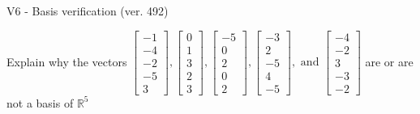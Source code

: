 \begin{exercise}
  \begin{exerciseTitle}V6 - Basis verification (ver. 492)\end{exerciseTitle}
  \begin{exerciseStatement}
    Explain why the vectors \(\left[\begin{array}{r}
-1 \\
-4 \\
-2 \\
-5 \\
3
\end{array}\right] , \left[\begin{array}{r}
0 \\
1 \\
3 \\
2 \\
3
\end{array}\right] , \left[\begin{array}{r}
-5 \\
0 \\
2 \\
0 \\
2
\end{array}\right] , \left[\begin{array}{r}
-3 \\
2 \\
-5 \\
4 \\
-5
\end{array}\right] , \text{ and } \left[\begin{array}{r}
-4 \\
-2 \\
3 \\
-3 \\
-2
\end{array}\right]\) are or are not a basis of \(\mathbb{R}^5\)	



\end{exerciseStatement}
\end{exercise}
